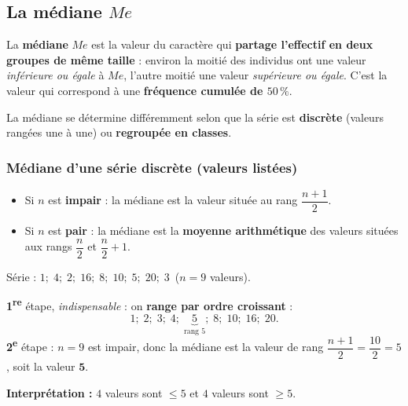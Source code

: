 \documentclass[11pt,a4paper]{article}
\newcommand{\med}{M\!e}                  %
\begin{document}
\subsection{La médiane $\med$}

\begin{definition}[médiane]
La \textbf{médiane} $\med$ est la valeur du caractère qui \textbf{partage l'effectif en deux groupes
de même taille} : environ la moitié des individus ont une valeur \emph{inférieure ou égale} à $\med$,
l'autre moitié une valeur \emph{supérieure ou égale}. C'est la valeur qui correspond à une
\textbf{fréquence cumulée de $50\,\%$}.
\end{definition}

La médiane se détermine différemment selon que la série est \textbf{discrète} (valeurs rangées une
à une) ou \textbf{regroupée en classes}.

\subsubsection{Médiane d'une série discrète (valeurs listées)}

\begin{formule}
\begin{itemize}[leftmargin=1.6em,topsep=2pt,itemsep=2pt]
  \item Si $n$ est \textbf{impair} : la médiane est la valeur située au rang
        $\dfrac{n+1}{2}$.
  \item Si $n$ est \textbf{pair} : la médiane est la \textbf{moyenne arithmétique} des valeurs
        situées aux rangs $\dfrac{n}{2}$ et $\dfrac{n}{2}+1$.
\end{itemize}
\end{formule}

\begin{exemple}
Série : $1;\;4;\;2;\;16;\;8;\;10;\;5;\;20;\;3$ \,($n=9$ valeurs).
\smallskip

\textbf{1\textsuperscript{re}} étape, \emph{indispensable} : on \textbf{range par ordre croissant} :
\[ 1;\;2;\;3;\;4;\;\underbrace{5}_{\text{rang }5};\;8;\;10;\;16;\;20. \]
\textbf{2\textsuperscript{e}} étape : $n=9$ est impair, donc la médiane est la valeur de rang
$\dfrac{n+1}{2}=\dfrac{10}{2}=5$, soit la valeur $\mathbf{5}$.
\smallskip

\textbf{Interprétation :} $4$ valeurs sont $\leqslant 5$ et $4$ valeurs sont $\geqslant 5$.
\end{exemple}
\end{document}
